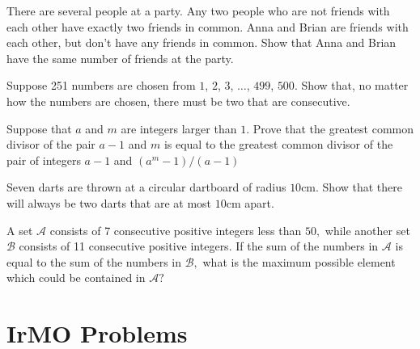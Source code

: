\documentclass{pset}
\begin{document}
\begin{problems}
\begin{problem}
    There are several people at a party. Any two people who are not friends with each other have exactly two friends in common. Anna and Brian are friends with each other, but don't have any friends in common. Show that Anna and Brian have the same number of friends at the party.
\end{problem}

\begin{problem}
    Suppose 251 numbers are chosen from $1$, $2$, $3$, $\dots$, $499$, $500$. Show that, no matter how the numbers are chosen, there must be two that are consecutive.
\end{problem}

\begin{problem}
    Suppose that \(a\) and \(m\) are integers larger than \(1 .\) Prove that the greatest common divisor of the pair \(a-1\) and \(m\) is equal to the greatest common divisor of the pair of integers \(a-1\) and \(\left(a^{m}-1\right) /(a-1)\)
\end{problem}

\begin{problem}
    Seven darts are thrown at a circular dartboard of radius \(10 \mathrm{cm} .\) Show that there will always be two darts that are at most \(10 \mathrm{cm}\) apart.
\end{problem}

\begin{problem}
    A set \(\mathcal{A}\) consists of 7 consecutive positive integers less than \(50,\) while another set \(\mathcal{B}\) consists
    of 11 consecutive positive integers. If the sum of the numbers in \(\mathcal{A}\) is equal to the sum of the numbers in \(\mathcal{B},\) what is the maximum possible element which could be contained in
    \(\mathcal{A} ?\)
\end{problem}

\end{problems}

\clearpage
\section*{IrMO Problems}
\end{document}
